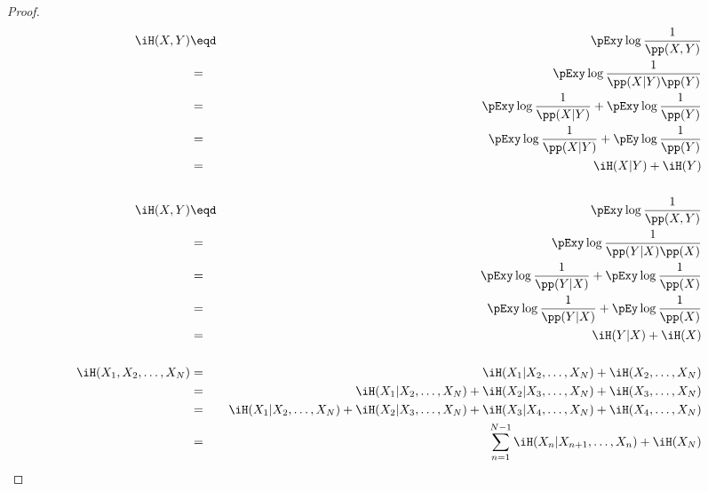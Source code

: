 \begin{theorem}
\label{thm:chain}
\end{theorem}
\begin{proof}
\begin{eqnarray*}
  \iH(X,Y)
    &\eqd& \pExy \log \frac{1}{\pp(X,Y)}
  \\&=&    \pExy \log \frac{1}{\pp(X|Y)\pp(Y)}
  \\&=&    \pExy \log \frac{1}{\pp(X|Y)} + \pExy \log \frac{1}{\pp(Y)}
  \\&=&    \pExy \log \frac{1}{\pp(X|Y)} + \pEy \log \frac{1}{\pp(Y)}
  \\&=&    \iH(X|Y) + \iH(Y)
\\
\\
  \iH(X,Y)
    &\eqd& \pExy \log \frac{1}{\pp(X,Y)}
  \\&=&    \pExy \log \frac{1}{\pp(Y|X)\pp(X)}
  \\&=&    \pExy \log \frac{1}{\pp(Y|X)} + \pExy \log \frac{1}{\pp(X)}
  \\&=&    \pExy \log \frac{1}{\pp(Y|X)} + \pEy \log \frac{1}{\pp(X)}
  \\&=&    \iH(Y|X) + \iH(X)
\\
\\
  \iH(X_1,X_2,\ldots,X_N) 
    &=& \iH(X_1|X_2,\ldots,X_N) + \iH(X_2,\ldots,X_N)
  \\&=& \iH(X_1|X_2,\ldots,X_N) + \iH(X_2|X_3,\ldots,X_N) + \iH(X_3,\ldots,X_N)
  \\&=& \iH(X_1|X_2,\ldots,X_N) + \iH(X_2|X_3,\ldots,X_N) + \iH(X_3|X_4,\ldots,X_N) + \iH(X_4,\ldots,X_N)
  \\&=& \sum_{n=1}^{N-1}\iH(X_n|X_{n+1},\ldots,X_n) + \iH(X_N)
\end{eqnarray*}
\end{proof}


